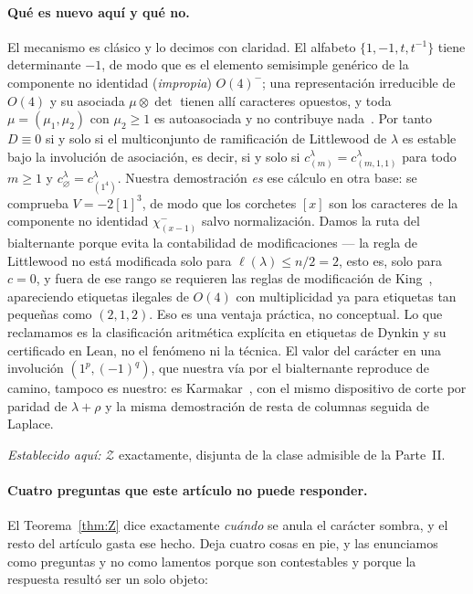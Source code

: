 \documentclass[11pt,a4paper]{article}
\begin{document}
\paragraph{Qué es nuevo aquí y qué no.} El mecanismo es clásico y lo decimos con claridad. El
alfabeto $\{1,-1,t,t^{-1}\}$ tiene determinante $-1$, de modo que es el elemento semisimple
genérico de la componente no identidad (\emph{impropia}) $O(4)^-$; una representación irreducible de $O(4)$
y su asociada $\mu\otimes\det$ tienen allí caracteres opuestos, y toda
$\mu=(\mu_1,\mu_2)$ con $\mu_2\ge1$ es autoasociada y no contribuye
nada~\cite[Thm.~5]{Brauer}. Por tanto $D\equiv0$ si y solo si el multiconjunto de
ramificación de Littlewood de $\lambda$ es estable bajo la involución de asociación, es
decir, si y solo si $c^\lambda_{(m)}=c^\lambda_{(m,1,1)}$ para todo $m\ge1$ y
$c^\lambda_\varnothing=c^\lambda_{(1^4)}$. Nuestra demostración \emph{es} ese cálculo en otra
base: se comprueba $V=-2[1]^3$, de modo que los corchetes $[x]$ son los caracteres de la
componente no identidad $\chi^-_{(x-1)}$ salvo normalización. Damos la ruta del bialternante
porque evita la contabilidad de modificaciones --- la regla de Littlewood no está modificada
solo para $\ell(\lambda)\le n/2=2$, esto es, solo para $c=0$, y fuera de ese rango se
requieren las reglas de modificación de King~\cite{King71,Newell,Brauer}, apareciendo etiquetas
ilegales de $O(4)$ con multiplicidad ya para etiquetas tan pequeñas como $(2,1,2)$. Eso es una
ventaja práctica, no conceptual. Lo que reclamamos es la clasificación aritmética explícita
en etiquetas de Dynkin y su certificado en Lean, no el fenómeno ni la técnica. El valor del
carácter en una involución $(1^p,(-1)^q)$, que nuestra vía por el bialternante reproduce de
camino, tampoco es nuestro: es Karmakar~\cite[Tma.~4.1]{Karmakar}, con el mismo dispositivo de
corte por paridad de $\lambda+\rho$ y la misma demostración de resta de columnas seguida de
Laplace.

\emph{Establecido aquí:} $\mathcal Z$ exactamente, disjunta de la clase admisible de la
Parte~II.

\paragraph{Cuatro preguntas que este artículo no puede responder.} El Teorema~\ref{thm:Z} dice
exactamente \emph{cuándo} se anula el carácter sombra, y el resto del artículo gasta ese hecho.
Deja cuatro cosas en pie, y las enunciamos como preguntas y no como lamentos porque son
contestables y porque la respuesta resultó ser un solo objeto:
\end{document}
